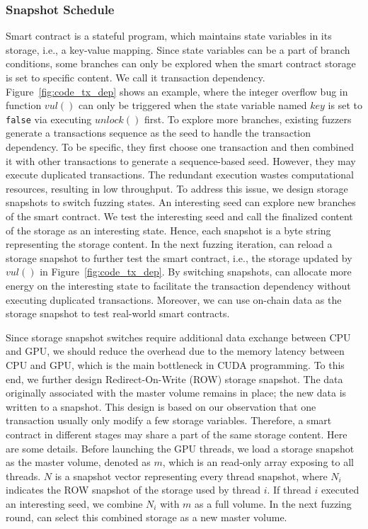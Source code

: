 \subsubsection{Snapshot Schedule}
\label{design:snapshot}
Smart contract is a stateful program, which maintains state variables in its storage, i.e., a key-value mapping. Since state variables can be a part of branch conditions, some branches can only be explored when the smart contract storage is set to specific content. 
We call it transaction dependency.
%
Figure~\ref{fig:code_tx_dep} shows an example, where the integer overflow bug in function $vul()$ can only be triggered when the state variable named $key$ is set to \texttt{false} via executing $unlock()$ first. 
%
To explore more branches, existing fuzzers generate a transactions sequence as the seed to handle the transaction dependency\cite{confuzzius_eurosp, echidna_issta, ilf_ccs}. 
%
To be specific, they first choose one transaction and then combined it with other transactions to generate a sequence-based seed. 
However, they may execute duplicated transactions. 
The redundant execution wastes computational resources, resulting in low throughput. 
%
To address this issue, we design storage snapshots to switch fuzzing states. 
An interesting seed can explore new branches of the smart contract. We test the interesting seed and call the finalized content of the storage as an interesting state.
%
Hence, each snapshot is a byte string representing the storage content. 
%
In the next fuzzing iteration, {\tool} can reload a storage snapshot to further test the smart contract, i.e., the storage updated by $vul()$ in Figure~\ref{fig:code_tx_dep}.
%
By switching snapshots, {\tool} can allocate more energy on the interesting state to facilitate the transaction dependency without executing duplicated transactions. Moreover, we can use on-chain data as the storage snapshot to test real-world smart contracts.

Since storage snapshot switches require additional data exchange between CPU and GPU, we should reduce the overhead due to the memory latency between CPU and GPU, which is the main bottleneck in CUDA programming\cite{}. 
To this end, we further design Redirect-On-Write (ROW) storage snapshot.
%
The data originally associated with the master volume remains in place; the new data is written to a snapshot\cite{row2021ibm}.
%
This design is based on our observation that one transaction usually only modify a few storage variables. 
Therefore, a smart contract in different stages may share a part of the same storage content.
%
Here are some details.
Before launching the GPU threads, we load a storage snapshot as the master volume, denoted as $m$, which is an read-only array exposing to all threads.
$N$ is a snapshot vector representing every thread snapshot, where $N_i$ indicates the ROW snapshot of the storage used by thread $i$.
%
If thread $i$ executed an interesting seed, we combine $N_i$ with $m$ as a full volume. 
In the next fuzzing round, {\runner} can select this combined storage as a new master volume.




